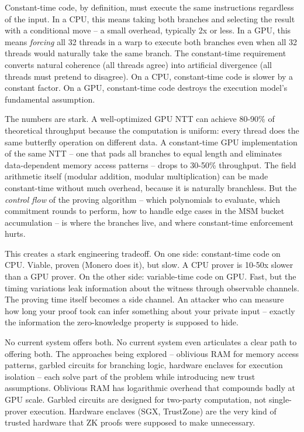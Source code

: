 \documentclass[
  11pt,
  openany]{report}
\begin{document}
Constant-time code, by definition, must execute the same instructions regardless
of the input. In a CPU, this means taking both branches and selecting the result
with a conditional move -- a small overhead, typically 2x or less. In a GPU,
this means \emph{forcing} all 32 threads in a warp to execute both branches even
when all 32 threads would naturally take the same branch. The constant-time
requirement converts natural coherence (all threads agree) into artificial
divergence (all threads must pretend to disagree). On a CPU, constant-time code
is slower by a constant factor. On a GPU, constant-time code destroys the
execution model's fundamental assumption.

The numbers are stark. A well-optimized GPU NTT can achieve 80-90\% of
theoretical throughput because the computation is uniform: every thread does the
same butterfly operation on different data. A constant-time GPU implementation
of the same NTT -- one that pads all branches to equal length and eliminates
data-dependent memory access patterns -- drops to 30-50\% throughput. The field
arithmetic itself (modular addition, modular multiplication) can be made
constant-time without much overhead, because it is naturally branchless. But the
\emph{control flow} of the proving algorithm -- which polynomials to evaluate,
which commitment rounds to perform, how to handle edge cases in the MSM bucket
accumulation -- is where the branches live, and where constant-time enforcement
hurts.

This creates a stark engineering tradeoff. On one side: constant-time code on
CPU. Viable, proven (Monero does it), but slow. A CPU prover is 10-50x slower
than a GPU prover. On the other side: variable-time code on GPU. Fast, but the
timing variations leak information about the witness through observable
channels. The proving time itself becomes a side channel. An attacker who can
measure how long your proof took can infer something about your private input --
exactly the information the zero-knowledge property is supposed to hide.

No current system offers both. No current system even articulates a clear path
to offering both. The approaches being explored -- oblivious RAM for memory
access patterns, garbled circuits for branching logic, hardware enclaves for
execution isolation -- each solve part of the problem while introducing new
trust assumptions. Oblivious RAM has logarithmic overhead that compounds badly
at GPU scale. Garbled circuits are designed for two-party computation, not
single-prover execution. Hardware enclaves (SGX, TrustZone) are the very kind of
trusted hardware that ZK proofs were supposed to make unnecessary.
\end{document}
